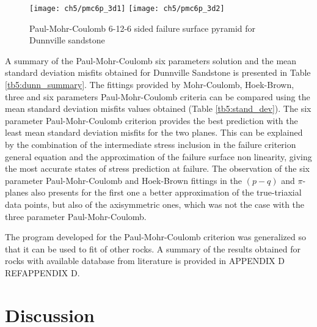 \begin{figure}
    \centering
    \texttt{[image: ch5/pmc6p\_3d1]}
    \texttt{[image: ch5/pmc6p\_3d2]}
    \caption{Paul-Mohr-Coulomb 6-12-6 sided failure surface pyramid for Dunnville sandstone}
    \label{fig5:pmc6p_3d}
\end{figure}

A summary of the Paul-Mohr-Coulomb six parameters solution and the mean standard deviation misfits obtained for Dunnville Sandstone is presented in Table \ref{tb5:dunn_summary}. The fittings provided by Mohr-Coulomb, Hoek-Brown, three and six parameters Paul-Mohr-Coulomb criteria can be compared using the mean standard deviation misfits values obtained (Table \ref{tb5:stand_dev}). 
The six parameter Paul-Mohr-Coulomb criterion provides the best prediction with the least mean standard deviation misfits for the two planes. This can be explained by the combination of the intermediate stress inclusion in the failure criterion general equation and the approximation of the failure surface non linearity, giving the most accurate states of stress prediction at failure. The observation of the six parameter Paul-Mohr-Coulomb and Hoek-Brown fittings in the $(p-q)$ and $\pi$- planes also presents for the first one a better approximation of the true-triaxial data points, but also of the axisymmetric ones, which was not the case with the three parameter Paul-Mohr-Coulomb. 

The program developed for the Paul-Mohr-Coulomb criterion was generalized so that it can be used to fit of other rocks. A summary of the results obtained for rocks with available database from literature is provided in APPENDIX D REF{APPENDIX D}.

\section{Discussion}

